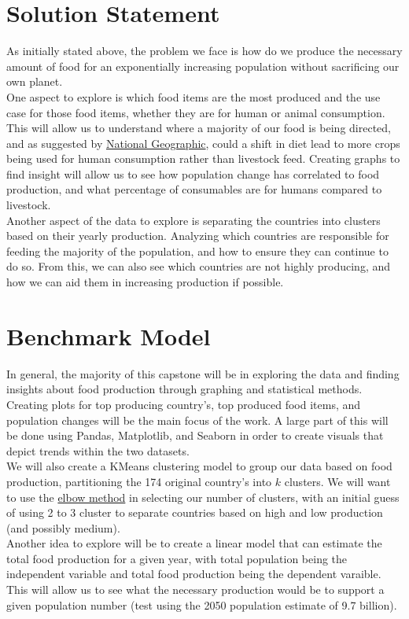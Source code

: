 \documentclass[12pt, a4paper]{article}
\begin{document}
\begin{spacing}{1.1}
	\section{Solution Statement}
	As initially stated above, the problem we face is how do we produce the necessary amount of food for an exponentially increasing population without sacrificing our own planet. \vspace*{2mm}\\	
	One aspect to explore is which food items are the most produced and the use case for those food items, whether they are for human or animal consumption. This will allow us to understand where a majority of our food is being directed, and as suggested by \href{https://www.nationalgeographic.com/foodfeatures/feeding-9-billion/}{National Geographic}, could a shift in diet lead to more crops being used for human consumption rather than livestock feed. Creating graphs to find insight will allow us to see how population change has correlated to food production, and what percentage of consumables are for humans compared to livestock. \vspace*{2mm}\\	
	Another aspect of the data to explore is separating the countries into clusters based on their yearly production. Analyzing which countries are responsible for feeding the majority of the population, and how to ensure they can continue to do so. From this, we can also see which countries are not highly producing, and how we can aid them in increasing production if possible.\newpage

	
	\section{Benchmark Model}
	In general, the majority of this capstone will be in exploring the data and finding insights about food production through graphing and statistical methods. Creating plots for top producing country's, top produced food items, and population changes will be the main focus of the work. A large part of this will be done using Pandas, Matplotlib, and Seaborn in order to create visuals that depict trends within the two datasets. \vspace*{2mm}\\	
	We will also create a KMeans clustering model to group our data based on food production, partitioning the 174 original country's into $k$ clusters. We will want to use the \href{https://www.scikit-yb.org/en/latest/api/cluster/elbow.html}{elbow method} in selecting our number of clusters, with an initial guess of using 2 to 3 cluster to separate countries based on high and low production (and possibly medium). \vspace*{2mm}\\
	Another idea to explore will be to create a linear model that can estimate the total food production for a given year, with total population being the independent variable and total food production being the dependent varaible. This will allow us to see what the necessary production would be to support a given population number (test using the 2050 population estimate of 9.7 billion).
	

\end{spacing}
\end{document}
